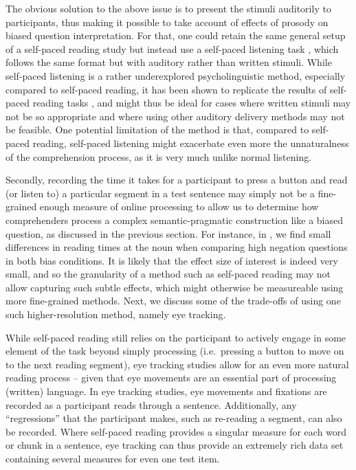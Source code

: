 \documentclass[output=paper,colorlinks,citecolor=brown]{langscibook}
\begin{document}
The obvious solution to the above issue is to present the stimuli auditorily to participants, thus making it possible to take account of effects of prosody on biased question interpretation. For that, one could retain the same general setup of a self-paced reading study but instead use a self-paced listening task \citep{ferreira1996effects}, which follows the same format but with auditory rather than written stimuli. While self-paced listening is a rather underexplored psycholinguistic method, especially compared to self-paced reading, it has been shown to replicate the results of self-paced reading tasks \citep{ferreira1996exploring, papadopoulou2013self}, and might thus be ideal for cases where written stimuli may not be so appropriate and where using other auditory delivery methods may not be feasible. One potential limitation of the method is that, compared to self-paced reading, self-paced listening might exacerbate even more the unnaturalness of the comprehension process, as it is very much unlike normal listening.

Secondly, recording the time it takes for a participant to press a button and read (or listen to) a particular segment in a test sentence may simply not be a fine-grained enough measure of online processing to allow us to determine how comprehenders process a complex semantic-pragmatic construction like a biased question, as discussed in the previous section. For instance, in \citet{macuch_processing_inprep}, we find small differences in reading times at the noun when comparing high negation questions in both bias conditions. It is likely that the effect size of interest is indeed very small, and so the granularity of a method such as self-paced reading may not allow capturing such subtle effects, which might otherwise be measureable using more fine-grained methods. Next, we discuss some of the trade-offs of using one such higher-resolution method, namely eye tracking.


While self-paced reading still relies on the participant to actively engage in some element of the task beyond simply processing (i.e.\ pressing a button to move on to the next reading segment), eye tracking studies \citep{Rayner1978} allow for an even more natural reading process -- given that eye movements are an essential part of processing (written) language. In eye tracking studies, eye movements and fixations are recorded as a participant reads through a sentence. Additionally, any ``regressions'' that the participant makes, such as re-reading a segment, can also be recorded. Where self-paced reading provides a singular measure for each word or chunk in a sentence, eye tracking can thus provide an extremely rich data set containing several measures for even one test item.
\end{document}
